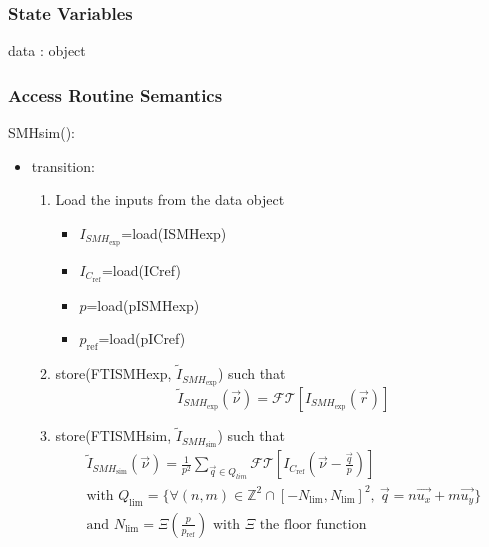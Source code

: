 \documentclass[12pt, titlepage]{article}
\begin{document}
\subsubsection{State Variables}

data : object

\subsubsection{Access Routine Semantics}

\noindent SMHsim():
\begin{itemize} 
\item transition: 
	\begin{enumerate}
	\item Load the inputs from the data object
	\begin{itemize}
	\item $I_{\mathit{SMH}_{\text{exp}}}$=load(ISMHexp)
	\item $I_{C_{\text{ref}}}$=load(ICref)
	\item $p$=load(pISMHexp)
	\item $p_{\text{ref}}$=load(pICref)
	\end{itemize}
	\item store(FTISMHexp, $\widetilde{I}_{\mathit{SMH}_{\text{exp}}}$) such that
	\begin{equation*}
\widetilde{I}_{\mathit{SMH}_{\text{exp}}}(\vec{\nu})=\mathcal{FT}[I_{\mathit{SMH}_{\text{exp}}}(\vec{r})]
	\end{equation*}
	\item store(FTISMHsim, $\widetilde{I}_{\mathit{SMH}_{\text{sim}}}$) such that
	\begin{equation*}
	\begin{gathered}
\widetilde{I}_{\mathit{SMH}_{\text{sim}}}(\vec{\nu})=\frac{1}{p^2}\sum_{\vec{q}\in 
Q_{lim}}\mathcal{FT}[I_{C_{\text{ref}}}(\vec{\nu}-\frac{\vec{q}}{p})] \\
	\text{with } Q_{\text{lim}}=\{\forall (n,m) \in 
\mathbb{Z}^{2}\cap[-N_{\text{lim}},N_{\text{lim}}]^2, \ 
\vec{q}=n\vec{u_x}+m\vec{u_y}\} \\
	\text{and } N_{\text{lim}}=\Xi(\frac{p}{p_{\text{ref}}}) \text{ with } \Xi 
\text{ the floor function } 
	\end{gathered}
	\end{equation*}
	\end{enumerate}


\end{itemize}
\end{document}
